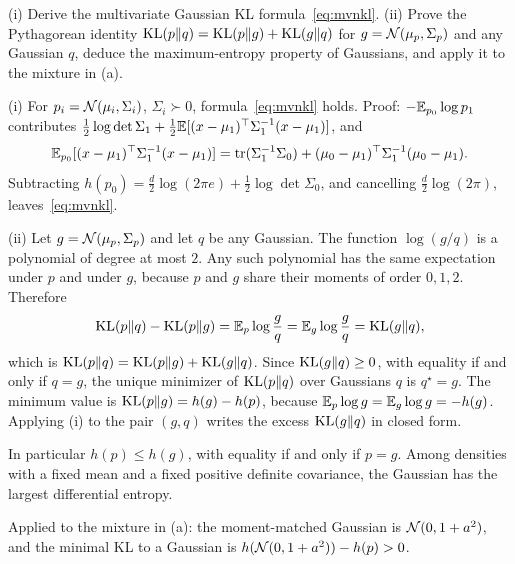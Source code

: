 \begin{hwqbox}
(i) Derive the multivariate Gaussian KL formula~\eqref{eq:mvnkl}. (ii) Prove the Pythagorean identity $\mathrm{KL}(p\Vert q)=\mathrm{KL}(p\Vert g)+\mathrm{KL}(g\Vert q)$ for $g=\mathcal{N}(\mu_p,\Sigma_p)$ and any Gaussian $q$, deduce the maximum-entropy property of Gaussians, and apply it to the mixture in (a).
\end{hwqbox}
\begin{hwsolbox}
(i) For $p_i=\mathcal{N}(\mu_i,\Sigma_i)$, $\Sigma_i\succ 0$, formula~\eqref{eq:mvnkl} holds. Proof: $-\mathbb{E}_{p_0}\log p_1$ contributes $\tfrac12\log\det\Sigma_1+\tfrac12\mathbb{E}[(x-\mu_1)^\top\Sigma_1^{-1}(x-\mu_1)]$, and
\[
\mathbb{E}_{p_0}[(x-\mu_1)^\top\Sigma_1^{-1}(x-\mu_1)]
=\operatorname{tr}(\Sigma_1^{-1}\Sigma_0)+(\mu_0-\mu_1)^\top\Sigma_1^{-1}(\mu_0-\mu_1).
\]
Subtracting $h(p_0)=\tfrac d2\log(2\pi e)+\tfrac12\log\det\Sigma_0$, and cancelling $\tfrac d2\log(2\pi)$, leaves~\eqref{eq:mvnkl}.

(ii) Let $g=\mathcal{N}(\mu_p,\Sigma_p)$ and let $q$ be any Gaussian. The function $\log(g/q)$ is a polynomial of degree at most $2$. Any such polynomial has the same expectation under $p$ and under $g$, because $p$ and $g$ share their moments of order $0,1,2$. Therefore
\[
\mathrm{KL}(p\Vert q)-\mathrm{KL}(p\Vert g)
=\mathbb{E}_p\log\frac gq
=\mathbb{E}_g\log\frac gq
=\mathrm{KL}(g\Vert q),
\]
which is $\mathrm{KL}(p\Vert q)=\mathrm{KL}(p\Vert g)+\mathrm{KL}(g\Vert q)$. Since $\mathrm{KL}(g\Vert q)\ge 0$, with equality if and only if $q=g$, the unique minimizer of $\mathrm{KL}(p\Vert q)$ over Gaussians $q$ is $q^\star=g$. The minimum value is $\mathrm{KL}(p\Vert g)=h(g)-h(p)$, because $\mathbb{E}_p\log g=\mathbb{E}_g\log g=-h(g)$. Applying (i) to the pair $(g,q)$ writes the excess $\mathrm{KL}(g\Vert q)$ in closed form.

In particular $h(p)\le h(g)$, with equality if and only if $p=g$. Among densities with a fixed mean and a fixed positive definite covariance, the Gaussian has the largest differential entropy.

Applied to the mixture in (a): the moment-matched Gaussian is $\mathcal{N}(0,1+a^2)$, and the minimal KL to a Gaussian is $h(\mathcal{N}(0,1+a^2))-h(p)>0$.
\end{hwsolbox}

